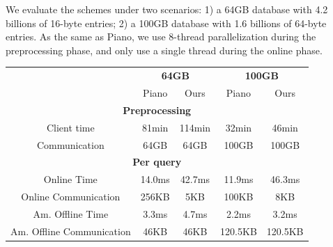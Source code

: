 We evaluate the schemes under two scenarios: 1) a 64GB database with 4.2 billions of 16-byte entries; 2) a 100GB database with 1.6 billions of 64-byte entries.
As the same as Piano, we use 8-thread parallelization during the preprocessing phase, and only use a single thread during the online phase.


\begin{table}[ht]
    \begin{centering}
        \begin{tabular}{ ccccc} 
            \toprule
            \multicolumn{1}{c}{} & \multicolumn{2}{c}{\bf 64GB} & \multicolumn{2}{c}{\bf 100GB }\\
              & Piano & Ours & Piano & Ours \\
            \midrule
            \multicolumn{5}{c}{{\bf Preprocessing}}\\ %
            \multirow{1}{*}{Client time} & 
            \multirow{1}{*}{ \cellcolor{green!35} 81min} & 
            \cellcolor{red!35} 114min & 
            \cellcolor{green!35} 32min &
            \multirow{1}{*}{ \cellcolor{red!35} 46min} \\
            Communication &  64GB & 64GB& 100GB &100GB \\
            \midrule
            \multicolumn{5}{c}{{\bf Per query}}\\ %
            Online Time & \cellcolor{green!35} 14.0ms &\cellcolor{red!35} 42.7ms & \cellcolor{green!35} 11.9ms &\cellcolor{red!35} 46.3ms \\
            
            Online Communication &  \cellcolor{red!35} 256KB & \cellcolor{green!35} 5KB &  \cellcolor{red!35} 100KB & \cellcolor{green!35} 8KB\\
            Am. Offline Time & \cellcolor{green!35} 3.3ms&\cellcolor{red!35}  4.7ms & \cellcolor{green!35} 2.2ms &\cellcolor{red!35} 3.2ms\\
            Am. Offline Communication &  46KB & 46KB &  120.5KB & 120.5KB \\  
            \midrule
            

\end{tabular}
\end{centering}
\end{table}
